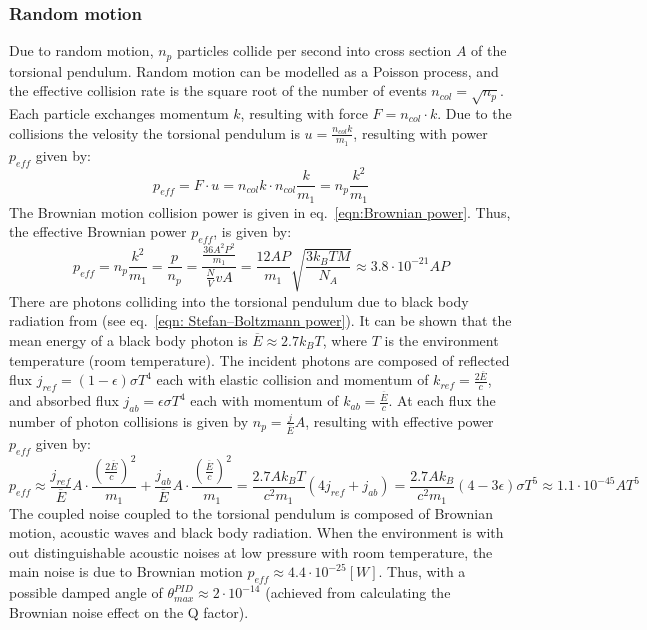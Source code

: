 \documentclass[\main/master.tex]{subfiles}
\begin{document}
\subsubsection{Random motion}
Due to random motion, $n_p$ particles collide per second into cross section $A$ of the torsional pendulum. Random motion can be modelled as a Poisson process, and the effective collision rate is the square root of the number of events $n_{col} = \sqrt{n_p}$. Each particle exchanges momentum $k$, resulting with force $F = n_{col}\cdot k$. Due to the collisions the velosity the torsional pendulum is $ u = \frac{n_{col}k}{m_1}$, resulting with power $p_{eff}$ given by:
\begin{equation}
p_{eff} = F\cdot u =  n_{col}k \cdot n_{col}\frac{k}{m_1} =  n_p\frac{ k^2}{m_1}
\label{eqn:net power}
\end{equation}
The Brownian motion collision power is given in eq.~\ref{eqn:Brownian power}. Thus, the effective Brownian power $p_{eff}$, is given by:
\begin{equation}
p_{eff} =  n_p\frac{ k^2}{m_1} = \frac{p}{n_p} = \frac{\frac{36A^2P^2}{m_1}}{\frac{N}{V}v A} = \frac{12AP}{m_1}\sqrt{\frac{3 k_B T M}{ N_A }}\approx 3.8\cdot 10^{-21}AP
\label{eqn:Brownian net power}
\end{equation}
There are photons colliding into the torsional pendulum due to black body radiation from (see eq.~\ref{eqn: Stefan–Boltzmann power}). It can be shown that the mean energy of a black body photon is $\overline{E}\approx 2.7k_B T$, where $T$ is the environment temperature (room temperature). The incident photons are composed of reflected flux $j_{ref}=(1-\epsilon)\sigma T^4$ each with elastic collision and momentum of $k_{ref} = \frac{2\overline{E}}{c} $, and absorbed flux $j_{ab}=\epsilon\sigma T^4$ each with momentum of $k_{ab} = \frac{\overline{E}}{c}$. At each flux the number of photon collisions is given by $n_p = \frac{j}{\overline{E}}A$, resulting with effective power $p_{eff}$ given by:
\begin{equation}
p_{eff}  \approx \frac{j_{ref}}{\overline{E}}A\cdot\frac{ (\frac{2\overline{E}}{c})^2}{m_1} +\frac{j_{ab}}{\overline{E}}A\cdot\frac{ (\frac{\overline{E}}{c})^2}{m_1} = \frac{  2.7 A k_B T }{ c^2 m_1} (4j_{ref}+j_{ab}) =\frac{2.7A k_B}{ c^2 m_1} (4-3\epsilon)\sigma T^5 \approx 1.1\cdot 10^{-45}AT^5
\label{eqn:photon collision power}
\end{equation}
The coupled noise coupled to the torsional pendulum is composed of Brownian motion, acoustic waves and black body radiation. When the environment is with out distinguishable acoustic noises at low pressure with room temperature, the main noise is due to Brownian motion $p_{eff}\approx 4.4\cdot 10^{-25}  [W]$. Thus, with a possible damped angle of $\theta_{max}^{PID}\approx 2\cdot 10^{-14}$ (achieved from calculating the Brownian noise effect on the Q factor).
\end{document}
